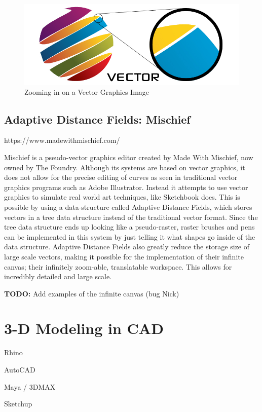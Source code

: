 \documentclass[12pt]{report}
\begin{document}
\begin{figure}
\includegraphics[width=\textwidth]{vector.jpg}
\caption{Zooming in on a Vector Graphics Image}
\end{figure}

\subsection{Adaptive Distance Fields: Mischief} https://www.madewithmischief.com/

Mischief is a pseudo-vector graphics editor created by Made With Mischief, now owned by The Foundry. 
Although its systems are based on vector graphics, it does not allow for the precise editing of curves as seen in traditional vector graphics programs such as Adobe Illustrator. 
Instead it attempts to use vector graphics to simulate real world art techniques, like Sketchbook does.
This is possible by using a data-structure called Adaptive Distance Fields, which stores vectors in a tree data structure instead of the traditional vector format.
Since the tree data structure ends up looking like a pseudo-raster, raster brushes and pens can be implemented in this system by just telling it what shapes go inside of the data structure.
Adaptive Distance Fields also greatly reduce the storage size of large scale vectors, making it possible for the implementation of their infinite canvas; their infinitely zoom-able, translatable workspace. 
This allows for incredibly detailed and large scale.

\textbf{TODO:} Add examples of the infinite canvas (bug Nick)


\section{3-D Modeling in CAD}

Rhino

AutoCAD

Maya / 3DMAX

Sketchup
\end{document}
